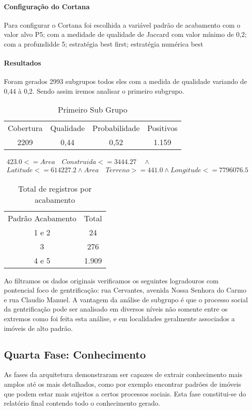 \documentclass[12pt]{article}
\begin{document}
\paragraph{Configuração do Cortana}
Para configurar o Cortana foi escolhida a variável padrão de acabamento com o valor alvo P5; com a medidade de qualidade de Jaccard com valor mínimo de 0,2; com a profundidde 5; estratégia best first; estratégia numérica best
\paragraph{Resultados}
Foram gerados 2993 subgrupos todos eles com a medida de qualidade variando de 0,44 à 0,2. Sendo assim iremos analisar o primeiro subgrupo.
\begin{table}[ht]
\centering
\label{table:sub}
\begin{tabular}{cccc}
 Cobertura & Qualidade & Probabilidade & Positivos  \\
 2209 & 0,44 & 0,52  &  1.159  \\
\end{tabular}
\caption{Primeiro Sub Grupo}
\end{table}

\begin{gather*}
423.0 <= Area \quad Construida <= 3444.27  \quad \land \\ Latitude <= 614227.2 \land Area \quad Terreno >= 441.0  \land Longitude <= 7796076.5
\end{gather*}
\begin{table}[ht]
\centering
\label{table:sub-aca}
\begin{tabular}{cc}
 Padrão Acabamento & Total  \\
 1 e 2 & 24 \\
 3 & 276 \\
 4 e 5 & 1.909 \\
\end{tabular}
\caption{Total de registros por acabamento}
\end{table}
Ao filtramos os dados originais verificamos os seguintes logradouros com pontencial foco de gentrificação: rua Cervantes, avenida Nossa Senhora do Carmo e rua Claudio Manuel. A vantagem da análise de subgrupo é que o processo social da gentrificação pode ser analisado em diversos níveis não somente entre os extremos como foi feita esta análise, e em localidades geralmente associados a imóveis de alto padrão.

\subsection{Quarta Fase: Conhecimento}
As fases da arquitetura demonstraram ser capazes de extrair conhecimento mais amplos até os mais detalhados, como por exemplo encontrar padrões de imóveis que podem estar mais sujeitos a certos processos sociais. Esta fase constitui-se do relatório final contendo todo o conhecimento gerado.
\end{document}
